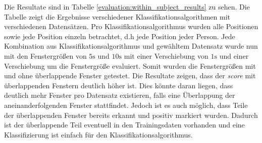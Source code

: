 Die Resultate sind in Tabelle \ref{evaluation:within_subject_results} zu sehen.
Die Tabelle zeigt die Ergebnisse verschiedener Klassifikationsalgorithmen mit verschiedenen Datensätzen.
Pro Klassifikationsalgorithmus wurden alle Positionen sowie jede Position einzeln betrachtet, d.h jede Position jeder Person.
Jede Kombination aus Klassifikationsalgorithmus und gewähltem Datensatz wurde nun mit den Fenstergrößen von $5\si{\s}$ und $10\si{\s}$ mit einer Verschiebung von $1\si{\s}$ und einer Verschiebung um die Fenstergröße evaluiert.
Somit wurden die Fenstergrößen mit und ohne überlappende Fenster getestet.
Die Resultate zeigen, dass der \textit{score} mit überlappenden Fenstern deutlich höher ist.
Dies könnte daran liegen, dass deutlich mehr Fenster pro Datensatz existieren, falls eine Überlappung der aneinanderfolgenden Fenster stattfindet.
Jedoch ist es auch möglich, dass Teile der überlappenden Fenster bereits erkannt und positiv markiert wurden.
Dadurch ist der überlappende Teil eventuell in den Trainingsdaten vorhanden und eine Klassifizierung ist einfach für den Klassifikationsalgorithmus.

